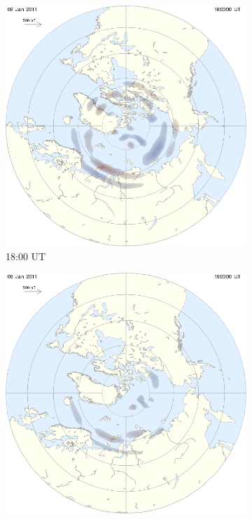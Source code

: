 \documentclass[10pt,a4paper]{article}
\begin{document}
\begin{figure}[h]
\centering
\begin{subfigure}{0.3\textwidth}
\centering
	\includegraphics[width=\textwidth]{ampere0.png}
	\caption{ 18:00 UT\label{amp18}}
\end{subfigure}
\begin{subfigure}{0.3\textwidth}
\centering
	\includegraphics[width=\textwidth]{ampere1.png}

\end{subfigure}
\end{figure}
\end{document}
